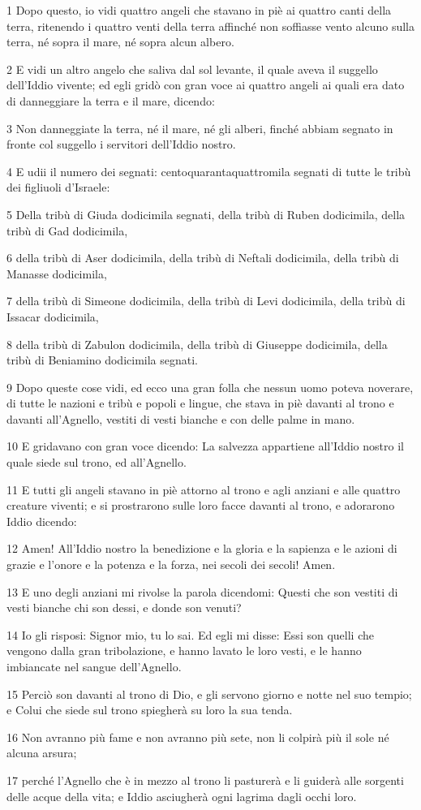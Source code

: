 \par 1 Dopo questo, io vidi quattro angeli che stavano in piè ai quattro canti della terra, ritenendo i quattro venti della terra affinché non soffiasse vento alcuno sulla terra, né sopra il mare, né sopra alcun albero.
\par 2 E vidi un altro angelo che saliva dal sol levante, il quale aveva il suggello dell'Iddio vivente; ed egli gridò con gran voce ai quattro angeli ai quali era dato di danneggiare la terra e il mare, dicendo:
\par 3 Non danneggiate la terra, né il mare, né gli alberi, finché abbiam segnato in fronte col suggello i servitori dell'Iddio nostro.
\par 4 E udii il numero dei segnati: centoquarantaquattromila segnati di tutte le tribù dei figliuoli d'Israele:
\par 5 Della tribù di Giuda dodicimila segnati, della tribù di Ruben dodicimila, della tribù di Gad dodicimila,
\par 6 della tribù di Aser dodicimila, della tribù di Neftali dodicimila, della tribù di Manasse dodicimila,
\par 7 della tribù di Simeone dodicimila, della tribù di Levi dodicimila, della tribù di Issacar dodicimila,
\par 8 della tribù di Zabulon dodicimila, della tribù di Giuseppe dodicimila, della tribù di Beniamino dodicimila segnati.
\par 9 Dopo queste cose vidi, ed ecco una gran folla che nessun uomo poteva noverare, di tutte le nazioni e tribù e popoli e lingue, che stava in piè davanti al trono e davanti all'Agnello, vestiti di vesti bianche e con delle palme in mano.
\par 10 E gridavano con gran voce dicendo: La salvezza appartiene all'Iddio nostro il quale siede sul trono, ed all'Agnello.
\par 11 E tutti gli angeli stavano in piè attorno al trono e agli anziani e alle quattro creature viventi; e si prostrarono sulle loro facce davanti al trono, e adorarono Iddio dicendo:
\par 12 Amen! All'Iddio nostro la benedizione e la gloria e la sapienza e le azioni di grazie e l'onore e la potenza e la forza, nei secoli dei secoli! Amen.
\par 13 E uno degli anziani mi rivolse la parola dicendomi: Questi che son vestiti di vesti bianche chi son dessi, e donde son venuti?
\par 14 Io gli risposi: Signor mio, tu lo sai. Ed egli mi disse: Essi son quelli che vengono dalla gran tribolazione, e hanno lavato le loro vesti, e le hanno imbiancate nel sangue dell'Agnello.
\par 15 Perciò son davanti al trono di Dio, e gli servono giorno e notte nel suo tempio; e Colui che siede sul trono spiegherà su loro la sua tenda.
\par 16 Non avranno più fame e non avranno più sete, non li colpirà più il sole né alcuna arsura;
\par 17 perché l'Agnello che è in mezzo al trono li pasturerà e li guiderà alle sorgenti delle acque della vita; e Iddio asciugherà ogni lagrima dagli occhi loro.

